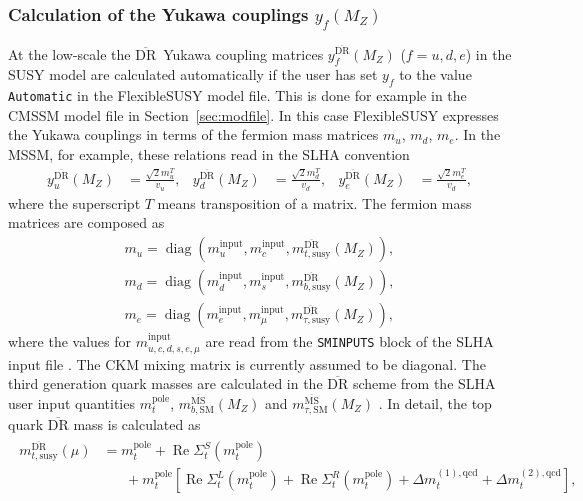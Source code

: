 \documentclass[final,3p,11pt,pdflatex]{elsarticle}
\makeatletter
\newcommand{\fs}{FlexibleSUSY\@\xspace}
\newcommand{\code}[1]{\lstinline|#1|}  %
\newcommand{\textoverline}[1]{$\overline{\mbox{#1}}$}
\newcommand{\DRbar}{\textoverline{DR}\xspace}
\newcommand{\MSbar}{\textoverline{MS}\xspace}
\newcommand{\userinput}{\text{input}}
\newcommand{\secref}[1]{Section~\ref{#1}}
\DeclareMathOperator{\diag}{diag}
\DeclareMathOperator{\re}{Re}
\makeatother
\begin{document}
\subsubsection{Calculation of the Yukawa couplings $y_f(M_Z)$}
\label{sec:calculation-of-yukawa-couplings}

At the low-scale the \DRbar\ Yukawa coupling matrices
$y_f^{\text{\DRbar}}(M_Z)$ ($f=u,d,e$) in the SUSY model are
calculated automatically if the user has set $y_f$ to the value
\code{Automatic} in the \fs model file.  This is done for example in
the CMSSM model file in \secref{sec:modfile}.  In this case \fs
expresses the Yukawa couplings in terms of the fermion mass matrices
$m_u$, $m_d$, $m_e$.  In the MSSM, for example, these relations read
in the SLHA convention \cite{Allanach:2008qq}
%
\begin{align}
  y_u^{\text{\DRbar}}(M_Z) &= \frac{\sqrt{2} m_{u}^T}{v_u} , &
  y_d^{\text{\DRbar}}(M_Z) &= \frac{\sqrt{2} m_{d}^T}{v_d} , &
  y_e^{\text{\DRbar}}(M_Z) &= \frac{\sqrt{2} m_{e}^T}{v_d} ,
\end{align}
%
where the superscript $T$ means transposition of a matrix.  The
fermion mass matrices are composed as
%
\begin{align}
  m_u = \diag(m_{u}^{\userinput}, m_{c}^{\userinput}, m_{t,\text{susy}}^{\text{\DRbar}}(M_Z)) ,\\
  m_d = \diag(m_{d}^{\userinput}, m_{s}^{\userinput}, m_{b,\text{susy}}^{\text{\DRbar}}(M_Z)) ,\\
  m_e = \diag(m_{e}^{\userinput}, m_{\mu}^{\userinput}, m_{\tau,\text{susy}}^{\text{\DRbar}}(M_Z)),
\end{align}
%
where the values for $m_{u,c,d,s,e,\mu}^{\userinput}$ are read from
the \code{SMINPUTS} block of the SLHA input file \cite{Skands:2003cj}.
The CKM mixing matrix is currently assumed to be diagonal.  The third
generation quark masses are calculated in the \DRbar scheme from the
SLHA user input quantities $m_t^\text{pole}$,
$m_{b,\text{SM}}^{\text{\MSbar}}(M_Z)$ and
$m_{\tau,\text{SM}}^{\text{\MSbar}}(M_Z)$ \cite{Skands:2003cj}.  In
detail, the top quark \DRbar mass is calculated as
%
\begin{align}
  \begin{split}
    m_{t,\text{susy}}^{\text{\DRbar}}(\mu) &= m_t^\text{pole} +
    \re\Sigma_{t}^{S}(m_t^\text{pole}) \\
    &\phantom{=\;} + m_t^\text{pole}
    \left[ \re\Sigma_{t}^{L}(m_t^\text{pole}) +
      \re\Sigma_{t}^{R}(m_t^\text{pole}) + \Delta
      m_t^{(1),\text{qcd}} + \Delta m_t^{(2),\text{qcd}} \right] ,
  \end{split}
\end{align}
\end{document}
